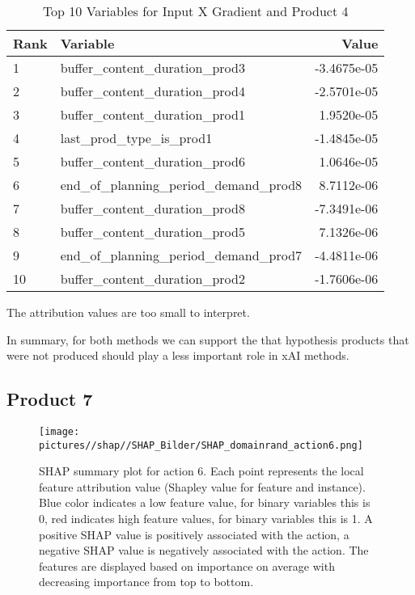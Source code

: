 \begin{table}[ht!]
    \footnotesize
    \centering
    \caption{Top 10 Variables for Input X Gradient and Product 4}
    \label{tab:top_variables_target3}
    \begin{tabularx}{\textwidth}{lXr}
        \toprule
        \textbf{Rank} & \textbf{Variable}                        & \textbf{Value} \\
        \midrule
        1             & buffer\_content\_duration\_prod3         & -3.4675e-05    \\
        2             & buffer\_content\_duration\_prod4         & -2.5701e-05    \\
        3             & buffer\_content\_duration\_prod1         & 1.9520e-05     \\
        4             & last\_prod\_type\_is\_prod1              & -1.4845e-05    \\
        5             & buffer\_content\_duration\_prod6         & 1.0646e-05     \\
        6             & end\_of\_planning\_period\_demand\_prod8 & 8.7112e-06     \\
        7             & buffer\_content\_duration\_prod8         & -7.3491e-06    \\
        8             & buffer\_content\_duration\_prod5         & 7.1326e-06     \\
        9             & end\_of\_planning\_period\_demand\_prod7 & -4.4811e-06    \\
        10            & buffer\_content\_duration\_prod2         & -1.7606e-06    \\
        \bottomrule
    \end{tabularx}
\end{table}
\FloatBarrier

The attribution values are too small to interpret.

In summary, for both methods we can support the that hypothesis products that were not produced should play a less important role in xAI methods.

\subsection{Product 7}
\begin{figure}[H]
    \centering
    \texttt{[image: pictures//shap//SHAP\_Bilder/SHAP\_domainrand\_action6.png]}
    \caption{SHAP summary plot for action 6.
        Each point represents the local feature attribution value (Shapley value for feature and instance).
        Blue color indicates a low feature value, for binary variables this is 0, red indicates high feature values, for binary variables this is 1. A positive SHAP value is positively associated with the action, a negative SHAP value is negatively associated with the action. The features are displayed based on importance on average with decreasing importance from top to bottom.}
    \label{fig:SHAP_Action6}
\end{figure}

